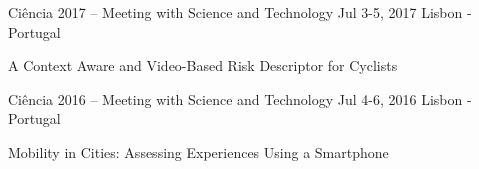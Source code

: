 \begin{cventries}

  \cventrypresentation
    {Ciência 2017 – Meeting with Science and Technology} %
    {Jul 3-5, 2017} %
    {Lisbon - Portugal} %
    {
      \begin{cvpresentationitems} %
        \item {} {A Context Aware and Video-Based Risk Descriptor for Cyclists}
      \end{cvpresentationitems}
    }


  \cventrypresentation
    {Ciência 2016 – Meeting with Science and Technology} %
    {Jul 4-6, 2016} %
    {Lisbon - Portugal} %
    {
      \begin{cvpresentationitems} %
        \item {} {Mobility in Cities: Assessing Experiences Using a Smartphone}
      \end{cvpresentationitems}
    }

  

\end{cventries}
